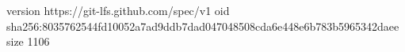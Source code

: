 version https://git-lfs.github.com/spec/v1
oid sha256:8035762544fd10052a7ad9ddb7dad047048508cda6e448e6b783b5965342daee
size 1106
